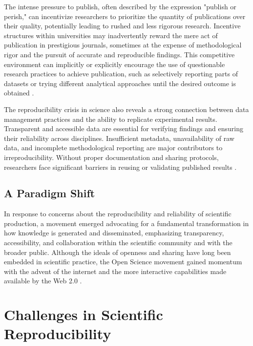 \documentclass[final]{rc-book-2.14}
\begin{document}
The intense pressure to publish, often described by the expression "publish or perish," can incentivize researchers to prioritize the quantity of publications over their quality, potentially leading to rushed and less rigorous research. Incentive structures within universities may inadvertently reward the mere act of publication in prestigious journals, sometimes at the expense of methodological rigor and the pursuit of accurate and reproducible findings. This competitive environment can implicitly or explicitly encourage the use of questionable research practices to achieve publication, such as selectively reporting parts of datasets or trying different analytical approaches until the desired outcome is obtained \cite{david_robert_grimes_modelling_2018}.

The reproducibility crisis in science also reveals a strong connection between data management practices and the ability to replicate experimental results. Transparent and accessible data are essential for verifying findings and ensuring their reliability across disciplines. Insufficient metadata, unavailability of raw data, and incomplete methodological reporting are major contributors to irreproducibility. Without proper documentation and sharing protocols, researchers face significant barriers in reusing or validating published results \cite{samuel_understanding_2021}.

\subsection{A Paradigm Shift}

In response to concerns about the reproducibility and reliability of scientific production, a movement emerged advocating for a fundamental transformation in how knowledge is generated and disseminated, emphasizing transparency, accessibility, and collaboration within the scientific community and with the broader public. Although the ideals of openness and sharing have long been embedded in scientific practice, the Open Science movement gained momentum with the advent of the internet and the more interactive capabilities made available by the Web 2.0 \cite{thibault_open_2023}.

\section{Challenges in Scientific Reproducibility}
\label{chp:review:sec:challenges}
\end{document}
